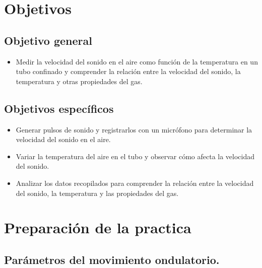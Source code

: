 \documentclass[twocolumn, 12pt]{article}
\begin{document}
\section{Objetivos}

\subsection{Objetivo general}

\begin{itemize}[label=$\rightharpoonup$]
    \item Medir la velocidad del sonido en el aire como función de la
          temperatura en un tubo confinado y comprender la relación
          entre la velocidad del sonido, la temperatura y otras
          propiedades del gas.
\end{itemize}

\subsection{Objetivos específicos}

\begin{itemize}[label=$\rightharpoonup$]
    \item Generar pulsos de sonido y registrarlos con un micrófono
          para determinar la velocidad del sonido en el aire.

    \item Variar la temperatura del aire en el tubo y observar cómo
          afecta la velocidad del sonido.

    \item Analizar los datos recopilados para comprender la relación
          entre la velocidad del sonido, la temperatura y las
          propiedades del gas.
\end{itemize}

\section{Preparación de la practica}

\subsection{Parámetros del movimiento ondulatorio.~\cite{Entradas_2016}}
\end{document}
